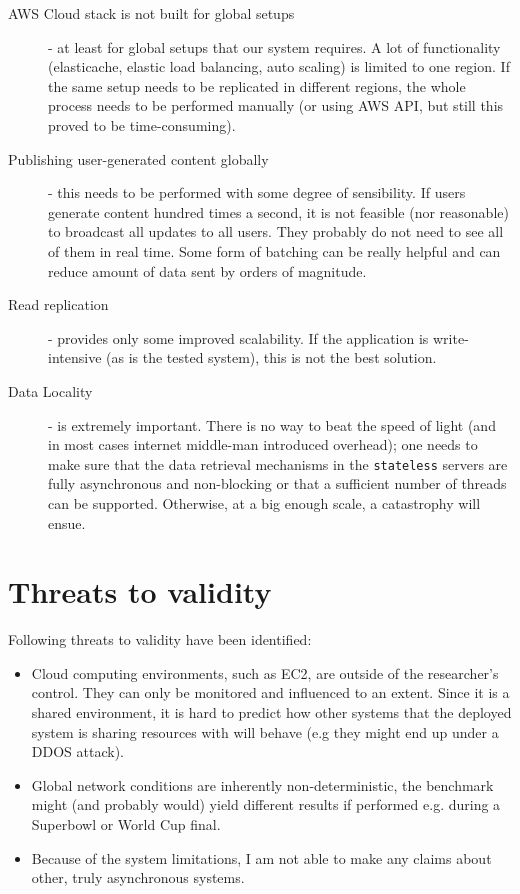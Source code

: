 \documentclass{uvamscse}
\begin{document}
\begin{description}
  \item[AWS Cloud stack is not built for global setups] - at least for global setups that our system requires. A lot of functionality (elasticache, elastic load balancing, auto scaling) is limited to one region. If the same setup needs to be replicated in different regions, the whole process needs to be performed manually (or using AWS API, but still this proved to be time-consuming).
  \item[Publishing user-generated content globally] - this needs to be performed with some degree of sensibility. If users generate content hundred times a second, it is not feasible (nor reasonable) to broadcast all updates to all users. They probably do not need to see all of them in real time. Some form of batching can be really helpful and can reduce amount of data sent by orders of magnitude.
  \item[Read replication] - provides only some improved scalability. If the application is write-intensive (as is the tested system), this is not the best solution.
  \item[Data Locality] - is extremely important. There is no way to beat the speed of light (and in most cases internet middle-man introduced overhead); one needs to make sure that the data retrieval mechanisms in the \texttt{stateless} servers are fully asynchronous and non-blocking or that a sufficient number of threads can be supported. Otherwise, at a big enough scale, a catastrophy will ensue.
\end{description}


\section{Threats to validity}
Following threats to validity have been identified:
\begin{itemize}
  \item Cloud computing environments, such as EC2, are outside of the researcher's control. They can only be monitored and influenced to an extent. Since it is a shared environment, it is hard to predict how other systems that the deployed system is sharing resources with will behave (e.g they might end up under a DDOS attack).
  \item Global network conditions are inherently non-deterministic, the benchmark might (and probably would) yield different results if performed e.g. during a Superbowl or World Cup final.
  \item Because of the system limitations, I am not able to make any claims about other, truly asynchronous systems.
\end{itemize}
\end{document}
